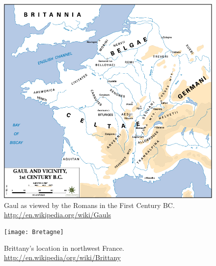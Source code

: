 \documentclass[twocolumn]{book}
\begin{document}
\begin{figure}
   \begin{center}
      \includegraphics[width=0.9\columnwidth]{images/Gaul-1st-century-BC}
      \caption{%
         Gaul as viewed by the Romans in the First Century BC\@.
         \url{http://en.wikipedia.org/wiki/Gauls}%
      }\label{fig:gaul-bc}
   \end{center}
\end{figure}

\begin{figure}
   \begin{center}
      \texttt{[image: Bretagne]}
      \caption{%
         Brittany's location in northwest France\@.
         \url{http://en.wikipedia/org/wiki/Brittany}
      }\label{fig:brittany}
   \end{center}
\end{figure}
\end{document}
